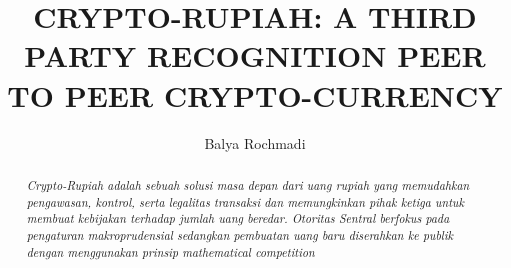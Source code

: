 \documentclass[12pt,a4paper]{article}
\author{Balya Rochmadi}
\title{CRYPTO-RUPIAH: A THIRD PARTY RECOGNITION PEER TO PEER CRYPTO-CURRENCY}
\begin{document}
	\maketitle
	\begin{abstract}
		\textit{Crypto-Rupiah adalah sebuah solusi masa depan dari uang rupiah yang memudahkan pengawasan, kontrol, serta legalitas transaksi dan memungkinkan pihak ketiga untuk membuat kebijakan terhadap jumlah uang beredar. Otoritas Sentral berfokus pada pengaturan makroprudensial sedangkan pembuatan uang baru diserahkan ke publik dengan menggunakan prinsip \textit{mathematical competition}  }
	\end{abstract}
	
	
	
	
	
	
	
	
	
\end{document}

